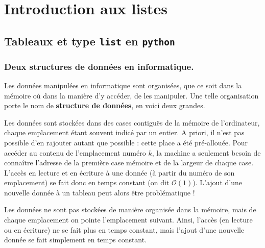 \setchapterpreamble[u]{\margintoc}
\chapter{Introduction aux listes}



\section{Tableaux et type \texttt{list} en \texttt{python}}

\subsection{Deux structures de données en informatique.}

Les données manipulées en informatique sont organisées, que ce soit dans la mémoire où dans la manière d'y accéder, de les manipuler. 
Une telle organisation porte le nom de \textbf{structure de données}, en voici deux grandes.  

\begin{defi}[Tableaux]
  Les données sont stockées dans des cases contiguës de la mémoire de l'ordinateur, chaque emplacement étant souvent indicé par un entier. 
    A priori, il n'est pas possible d'en rajouter autant que possible : cette place a été pré-allouée. 
    Pour accéder au contenu de l'emplacement numéro $k$, la machine a seulement besoin de connaître 
l'adresse de la première case mémoire et de la largeur de chaque case. 
    L'accès en lecture et en écriture à une donnée (à partir du numéro de son emplacement) se fait donc en temps constant (on dit $\mathcal{O}(1)$).
    L'ajout d'une nouvelle donnée à un tableau peut alors être problématique !
\end{defi}

\begin{defi}
Les données ne sont pas stockées de manière organisée dans la mémoire, 
mais de chaque emplacement on pointe l'emplacement suivant. 
    Ainsi, l'accès (en lecture ou en écriture) ne se fait plus en temps constant, mais l'ajout d'une nouvelle donnée se fait simplement en temps constant. 
\end{defi}

